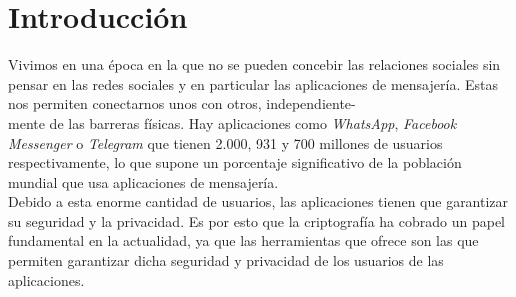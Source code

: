 \chapter{Introducción}
Vivimos en una época en la que no se pueden concebir las relaciones sociales sin pensar en las redes sociales y en particular las aplicaciones de mensajería. Estas nos permiten conectarnos unos con otros, independiente-\\mente de las barreras físicas.
Hay aplicaciones como  \emph{WhatsApp}, \emph{Facebook Messenger} o \emph{Telegram} que tienen 2.000, 931 y 700 millones de usuarios respectivamente, lo que supone un porcentaje significativo de la población mundial que usa aplicaciones de mensajería.\\  
Debido a esta enorme cantidad de usuarios, las aplicaciones tienen que garantizar su seguridad y la privacidad. Es por esto que la criptografía ha cobrado un papel fundamental en la actualidad, ya que las herramientas que ofrece son las que permiten garantizar dicha seguridad y privacidad de los usuarios de las aplicaciones.

